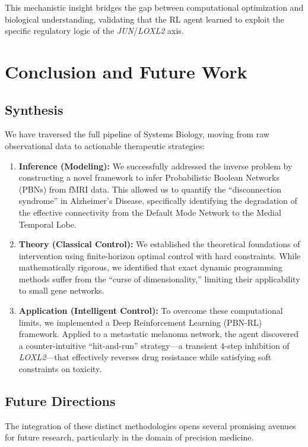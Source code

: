 \documentclass[12pt, a4paper]{report}
\begin{document}
	This mechanistic insight bridges the gap between computational optimization and biological understanding, validating that the RL agent learned to exploit the specific regulatory logic of the \textit{JUN}/\textit{LOXL2} axis.
	
	
	
	
	
\chapter{Conclusion and Future Work}

\section{Synthesis}
We have traversed the full pipeline of Systems Biology, moving from raw observational data to actionable therapeutic strategies:

\begin{enumerate}
	\item \textbf{Inference (Modeling):} We successfully addressed the inverse problem by constructing a novel framework to infer Probabilistic Boolean Networks (PBNs) from fMRI data. This allowed us to quantify the ``disconnection syndrome'' in Alzheimer's Disease, specifically identifying the degradation of the effective connectivity from the Default Mode Network to the Medial Temporal Lobe.
	\item \textbf{Theory (Classical Control):} We established the theoretical foundations of intervention using finite-horizon optimal control with hard constraints. While mathematically rigorous, we identified that exact dynamic programming methods suffer from the ``curse of dimensionality,'' limiting their applicability to small gene networks.
	\item \textbf{Application (Intelligent Control):} To overcome these computational limits, we implemented a Deep Reinforcement Learning (PBN-RL) framework. Applied to a metastatic melanoma network, the agent discovered a counter-intuitive ``hit-and-run'' strategy—a transient 4-step inhibition of \textit{LOXL2}—that effectively reverses drug resistance while satisfying soft constraints on toxicity.
\end{enumerate}

\section{Future Directions}
The integration of these distinct methodologies opens several promising avenues for future research, particularly in the domain of precision medicine.
\end{document}
